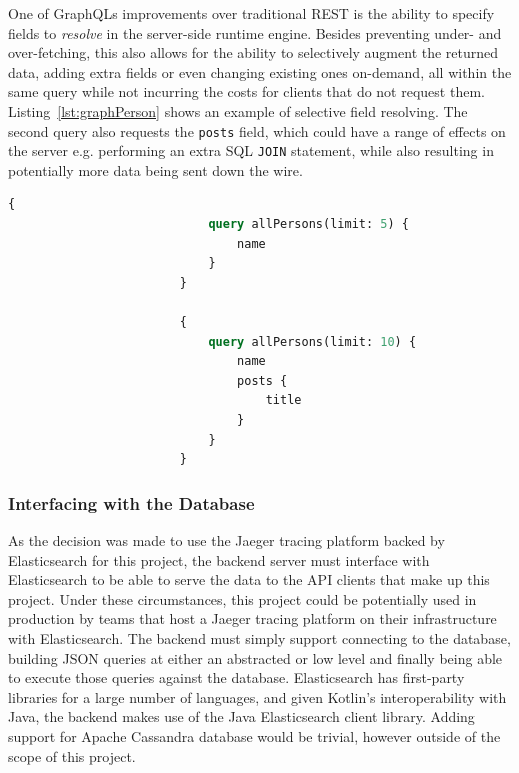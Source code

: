 \documentclass[12pt,pdftex,titlepage]{report}
\begin{document}
                    One of GraphQLs improvements over traditional REST is the ability to specify fields to \textit{resolve} in the server-side runtime engine. Besides preventing
                    under- and over-fetching, this also allows for the ability to selectively augment the returned data, adding extra fields or even changing existing ones on-demand,
                    all within the same query while not incurring the costs for clients that do not request them. Listing~\ref{lst:graphPerson} shows an example of selective field
                    resolving. The second query also requests the \texttt{posts} field, which could have a range of effects on the server e.g. performing an extra SQL \texttt{JOIN}
                    statement, while also resulting in potentially more data being sent down the wire.

                    \begin{lstlisting}[caption={A GraphQL query to fetch only the names of 5 people in a dataset compared to a query to fetch the names and post
                        titles associated with 10 people in the dataset.}, label={lst:graphPerson}, language=GraphQL, gobble=24]
                        {
                            query allPersons(limit: 5) {
                                name
                            }
                        }

                        {
                            query allPersons(limit: 10) {
                                name
                                posts {
                                    title
                                }
                            }
                        }
                    \end{lstlisting}

                \subsubsection{Interfacing with the Database}
                    As the decision was made to use the Jaeger tracing platform backed by Elasticsearch for this project, the backend server must interface with Elasticsearch
                    to be able to serve the data to the API clients that make up this project. Under these circumstances, this project could be potentially used in production
                    by teams that host a Jaeger tracing platform on their infrastructure with Elasticsearch. The backend must simply support connecting to the database, building 
                    JSON queries at either an abstracted or low level and finally being able to execute those queries against the database. Elasticsearch has first-party libraries
                    for a  large number of languages, and given Kotlin's interoperability with Java, the backend makes use of the Java Elasticsearch client library. Adding support 
                    for Apache Cassandra database would be trivial, however outside of the scope of this project.
\end{document}
